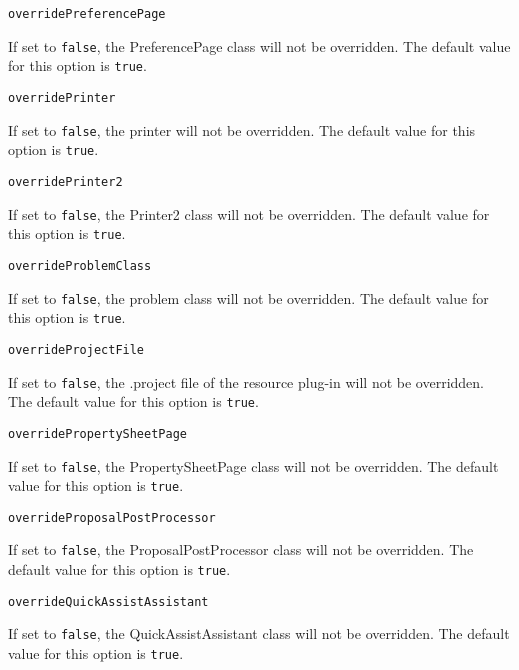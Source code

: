 \noindent\texttt{overridePreferencePage}
\begin{myindentpar}{1cm}
If set to \texttt{false}, the PreferencePage class will not be overridden. The default value for this option is \texttt{true}.
\end{myindentpar}

\noindent\texttt{overridePrinter}
\begin{myindentpar}{1cm}
If set to \texttt{false}, the printer will not be overridden. The default value for this option is \texttt{true}.
\end{myindentpar}

\noindent\texttt{overridePrinter2}
\begin{myindentpar}{1cm}
If set to \texttt{false}, the Printer2 class will not be overridden. The default value for this option is \texttt{true}.
\end{myindentpar}

\noindent\texttt{overrideProblemClass}
\begin{myindentpar}{1cm}
If set to \texttt{false}, the problem class will not be overridden. The default value for this option is \texttt{true}.
\end{myindentpar}

\noindent\texttt{overrideProjectFile}
\begin{myindentpar}{1cm}
If set to \texttt{false}, the .project file of the resource plug-in will not be overridden. The default value for this option is \texttt{true}.
\end{myindentpar}

\noindent\texttt{overridePropertySheetPage}
\begin{myindentpar}{1cm}
If set to \texttt{false}, the PropertySheetPage class will not be overridden. The default value for this option is \texttt{true}.
\end{myindentpar}

\noindent\texttt{overrideProposalPostProcessor}
\begin{myindentpar}{1cm}
If set to \texttt{false}, the ProposalPostProcessor class will not be overridden. The default value for this option is \texttt{true}.
\end{myindentpar}

\noindent\texttt{overrideQuickAssistAssistant}
\begin{myindentpar}{1cm}
If set to \texttt{false}, the QuickAssistAssistant class will not be overridden. The default value for this option is \texttt{true}.
\end{myindentpar}


